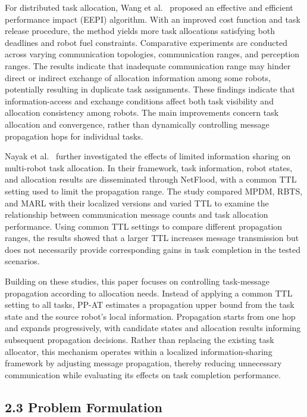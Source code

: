 \documentclass[type=submission,name=IR]{oae}
\begin{document}
For distributed task allocation, Wang et al.~\cite{wang_eepi} proposed an effective and efficient performance impact (EEPI) algorithm. With an improved cost function and task release procedure, the method yields more task allocations satisfying both deadlines and robot fuel constraints. Comparative experiments are conducted across varying communication topologies, communication ranges, and perception ranges. The results indicate that inadequate communication range may hinder direct or indirect exchange of allocation information among some robots, potentially resulting in duplicate task assignments. These findings indicate that information-access and exchange conditions affect both task visibility and allocation consistency among robots. The main improvements concern task allocation and convergence, rather than dynamically controlling message propagation hops for individual tasks.

Nayak et al.~\cite{nayak2025limited} further investigated the effects of limited information sharing on multi-robot task allocation. In their framework, task information, robot states, and allocation results are disseminated through NetFlood, with a common TTL setting used to limit the propagation range. The study compared MPDM, RBTS, and MARL with their localized versions and varied TTL to examine the relationship between communication message counts and task allocation performance. Using common TTL settings to compare different propagation ranges, the results showed that a larger TTL increases message transmission but does not necessarily provide corresponding gains in task completion in the tested scenarios.

Building on these studies, this paper focuses on controlling task-message propagation according to allocation needs. Instead of applying a common TTL setting to all tasks, PP-AT estimates a propagation upper bound from the task state and the source robot's local information. Propagation starts from one hop and expands progressively, with candidate states and allocation results informing subsequent propagation decisions. Rather than replacing the existing task allocator, this mechanism operates within a localized information-sharing framework by adjusting message propagation, thereby reducing unnecessary communication while evaluating its effects on task completion performance.
\subsection{2.3 Problem Formulation}
\end{document}
